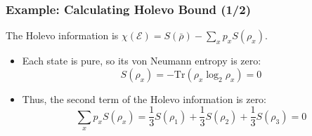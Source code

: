 \begin{frame}
    \frametitle{Example: Calculating Holevo Bound (1/2)}

    The Holevo information is $\chi(\mathcal{E}) = S(\bar{\rho}) - \sum_x p_x S(\rho_x)$.

    \vspace{0.2cm}

    \begin{itemize}
        \item Each state is pure, so its von Neumann entropy is zero:
              \begin{equation*}
                  S(\rho_x) = - \text{Tr}(\rho_x \log_2 \rho_x) = 0
              \end{equation*}

        \item Thus, the second term of the Holevo information is zero:
              \begin{equation*}
                  \sum_x p_x S(\rho_x) = \frac{1}{3} S(\rho_1) + \frac{1}{3} S(\rho_2) + \frac{1}{3} S(\rho_3) = 0
              \end{equation*}
    \end{itemize}

\end{frame}

